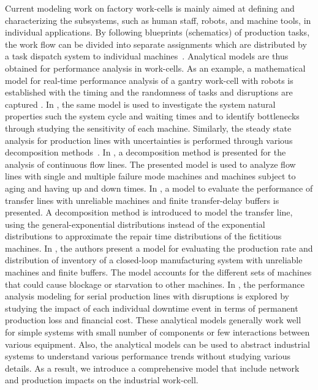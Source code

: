 Current modeling work on factory work-cells is mainly aimed at defining and characterizing the subsystems, such as human staff, robots, and machine tools, in individual applications. By following blueprints (schematics) of production tasks, the work flow can be divided into separate assignments which are distributed by a task dispatch system to individual machines~\cite{IkeaBot}. Analytical models are thus obtained for performance analysis in work-cells. As an example, a mathematical model for real-time performance analysis of a gantry work-cell with robots is established with the timing and the randomness of tasks and disruptions are captured  \cite{8098604}. In \cite{OU2017212}, the same model is used to investigate the system natural properties such the system cycle and waiting times and to identify bottlenecks through studying the sensitivity of each machine. Similarly, the steady state analysis for production lines with uncertainties is performed through various decomposition methods~\cite{Colledani2013,doi:10.1080/00207543.2012.713137,doi:10.1080/00207540500385980}. In \cite{Colledani2013}, a decomposition method is presented for the analysis of continuous flow lines. The presented model is used to analyze flow lines with single and multiple failure mode machines and machines subject to aging and having up and down times. In \cite{doi:10.1080/00207543.2012.713137}, a model to evaluate the performance of transfer lines with unreliable machines and finite transfer-delay buffers is presented. A decomposition method is introduced to model the transfer line, using the general-exponential distributions instead of the exponential distributions to approximate the repair time distributions of the fictitious machines. In \cite{doi:10.1080/00207540500385980}, the authors present a model for evaluating the production rate and distribution of inventory of a closed-loop manufacturing system with unreliable machines and finite buffers. The model accounts for the different sets of machines that could cause blockage or starvation to other machines. In \cite{QChang,Liu2012}, the performance analysis modeling for serial production lines with disruptions is explored by studying the impact of each individual downtime event in terms of permanent production loss and financial cost. These analytical models generally work well for simple systems with small number of components or few interactions between various equipment. Also, the analytical models can be used to abstract industrial systems to understand various performance trends without studying various details. As a result, we introduce a comprehensive model that include network and production impacts on the industrial work-cell.  

